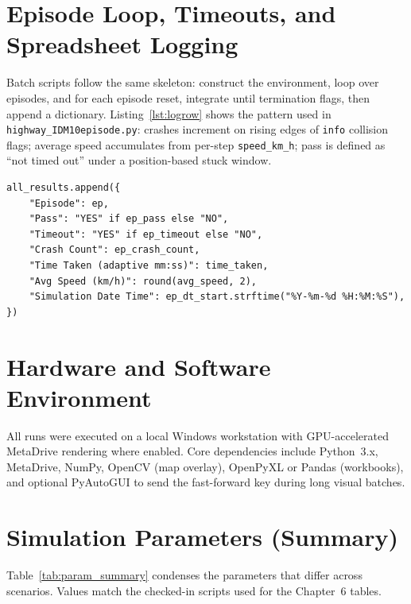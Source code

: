 \documentclass[12pt,a4paper]{report}
\begin{document}
\section{Episode Loop, Timeouts, and Spreadsheet Logging}
Batch scripts follow the same skeleton: construct the environment, loop over episodes, and for each episode reset, integrate until termination flags, then append a dictionary. Listing~\ref{lst:logrow} shows the pattern used in \texttt{highway\_IDM10episode.py}: crashes increment on rising edges of \texttt{info} collision flags; average speed accumulates from per-step \texttt{speed\_km\_h}; pass is defined as ``not timed out'' under a position-based stuck window.

\begin{lstlisting}[caption={Representative episode summary row (\texttt{highway\_IDM10episode.py}).},label={lst:logrow},float=H]
all_results.append({
    "Episode": ep,
    "Pass": "YES" if ep_pass else "NO",
    "Timeout": "YES" if ep_timeout else "NO",
    "Crash Count": ep_crash_count,
    "Time Taken (adaptive mm:ss)": time_taken,
    "Avg Speed (km/h)": round(avg_speed, 2),
    "Simulation Date Time": ep_dt_start.strftime("%Y-%m-%d %H:%M:%S"),
})
\end{lstlisting}

\section{Hardware and Software Environment}
All runs were executed on a local Windows workstation with GPU-accelerated MetaDrive rendering where enabled. Core dependencies include Python~3.x, MetaDrive, NumPy, OpenCV (map overlay), OpenPyXL or Pandas (workbooks), and optional PyAutoGUI to send the fast-forward key during long visual batches.

\section{Simulation Parameters (Summary)}
Table~\ref{tab:param_summary} condenses the parameters that differ across scenarios. Values match the checked-in scripts used for the Chapter~6 tables.
\end{document}
